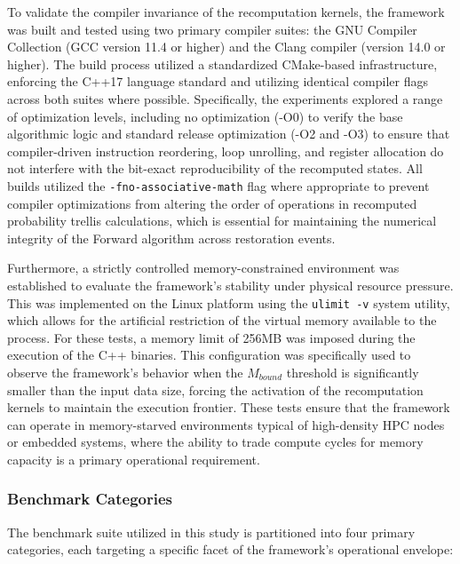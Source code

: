 To validate the compiler invariance of the recomputation kernels, the framework was built and tested using two primary compiler suites: the GNU Compiler Collection (GCC version 11.4 or higher) and the Clang compiler (version 14.0 or higher). The build process utilized a standardized CMake-based infrastructure, enforcing the C++17 language standard and utilizing identical compiler flags across both suites where possible. Specifically, the experiments explored a range of optimization levels, including no optimization (-O0) to verify the base algorithmic logic and standard release optimization (-O2 and -O3) to ensure that compiler-driven instruction reordering, loop unrolling, and register allocation do not interfere with the bit-exact reproducibility of the recomputed states. All builds utilized the \texttt{-fno-associative-math} flag where appropriate to prevent compiler optimizations from altering the order of operations in recomputed probability trellis calculations, which is essential for maintaining the numerical integrity of the Forward algorithm across restoration events.

Furthermore, a strictly controlled memory-constrained environment was established to evaluate the framework's stability under physical resource pressure. This was implemented on the Linux platform using the \texttt{ulimit -v} system utility, which allows for the artificial restriction of the virtual memory available to the process. For these tests, a memory limit of 256MB was imposed during the execution of the C++ binaries. This configuration was specifically used to observe the framework's behavior when the $M_{bound}$ threshold is significantly smaller than the input data size, forcing the activation of the recomputation kernels to maintain the execution frontier. These tests ensure that the framework can operate in memory-starved environments typical of high-density HPC nodes or embedded systems, where the ability to trade compute cycles for memory capacity is a primary operational requirement.

\subsubsection{Benchmark Categories}

The benchmark suite utilized in this study is partitioned into four primary categories, each targeting a specific facet of the framework's operational envelope:

